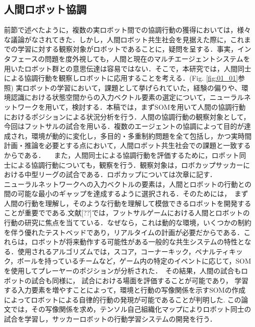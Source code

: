 \subsection{人間ロボット協調}
前節で述べたように，複数の実ロボット間での協調行動の獲得においては，様々な議論がなされてきた．しかし，人間ロボット共生社会を見据えた際に，これまでの学習に対する観察対象がロボットであることに，疑問を呈する．事実，インタフェースの問題を度外視しても，人間と現在のマルチエージェントシステムを用いたロボット群との意思伝達は容易ではない．そこで，本研究では，人間同士による協調行動を観察しロボットに応用することを考える．(Fig. \ref{fig:01_01}参照) 実ロボットの学習において，課題として挙げられていた，経験の偏りや、環境認識における状態空間からの入力ベクトル要素の選定について，ニューラルネットワークを用いて，検討する．本稿では，まずSOMを用いて人間の協調行動におけるポジションによる状況分析を行う．人間の協調行動の観察対象として，今回はフットサルの試合を用いる．複数のエージェントの協調によって目的が達成され，環境が動的に変化し，多目的・多重制約問題を全て包括し，かつ実時間計画・推論を必要とする点において，人間ロボット共生社会での課題と一致するからである．
　また，人間同士による協調行動を評価するために，ロボット同士による協調行動についても，観察を行う．観察対象は，ロボカップサッカーにおける中型リーグの試合である．ロボカップについては次章に記す．\\
ニューラルネットワークへの入力ベクトルの要素は，人間とロボットの行動との間の可能な最小のギャップを達成するように選択される．そのためには，　まず人間の行動を理解し，そのような行動を理解して模倣できるロボットを開発することが重要でである.文献[??]では，フットサルゲームにおける人間とロボットの行動の研究に焦点を当てている．なぜなら，これは動的な環境，いくつかの制約を伴う優れたテストベッドであり，リアルタイムの計画が必要だからである．これらは，ロボットが将来動作する可能性がある一般的な共生システムの特性となる．使用されるアルゴリズムでは，スコア，コーナーキック，ペナルティキック，ボールを持っているチームなど，ゲーム内の特定のイベントに応じて，SOMを使用してプレーヤーのポジションが分析された．　その結果，人間の試合もロボットの試合も同様に， 試合における場面を評価することが可能であり， 学習する入力要素を増やすことによって，環境と行動の写像関係を示すSOMの作成によってロボットによる自律的行動の発現が可能であることが判明した. この論文では，その写像関係を求め，テンソル自己組織化マップによりロボット同士の試合を学習し，サッカーロボットの行動学習システムの開発を行う．


